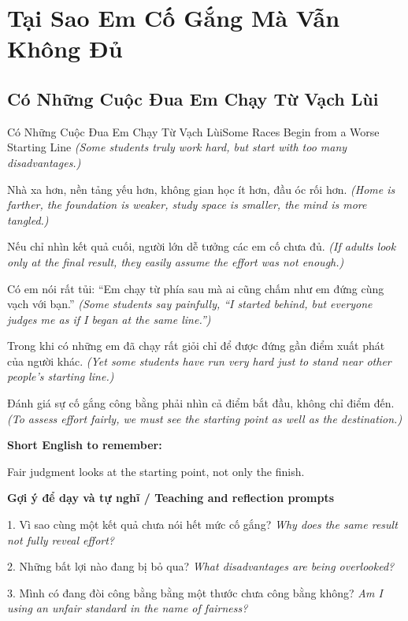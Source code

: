\chapter{Tại Sao Em Cố Gắng Mà Vẫn Không Đủ}

\section{Có Những Cuộc Đua Em Chạy Từ Vạch Lùi}
\begin{truyen}{Có Những Cuộc Đua Em Chạy Từ Vạch Lùi}{Some Races Begin from a Worse Starting Line}
\textit{(Some students truly work hard, but start with too many disadvantages.)}

Nhà xa hơn, nền tảng yếu hơn, không gian học ít hơn, đầu óc rối hơn.
\textit{(Home is farther, the foundation is weaker, study space is smaller, the mind is more tangled.)}

Nếu chỉ nhìn kết quả cuối, người lớn dễ tưởng các em cố chưa đủ.
\textit{(If adults look only at the final result, they easily assume the effort was not enough.)}

Có em nói rất tủi: “Em chạy từ phía sau mà ai cũng chấm như em đứng cùng vạch với bạn.”
\textit{(Some students say painfully, “I started behind, but everyone judges me as if I began at the same line.”)}

Trong khi có những em đã chạy rất giỏi chỉ để được đứng gần điểm xuất phát của người khác.
\textit{(Yet some students have run very hard just to stand near other people's starting line.)}

\end{truyen}

\begin{baihoc}
Đánh giá sự cố gắng công bằng phải nhìn cả điểm bắt đầu, không chỉ điểm đến.
\textit{(To assess effort fairly, we must see the starting point as well as the destination.)}
\end{baihoc}

\begin{ghinhoanh}
\textbf{Short English to remember:}

Fair judgment looks at the starting point, not only the finish.

\end{ghinhoanh}

\begin{tuhocnhanh}
\textbf{Gợi ý để dạy và tự nghĩ / Teaching and reflection prompts}

1. Vì sao cùng một kết quả chưa nói hết mức cố gắng? \textit{Why does the same result not fully reveal effort?}

2. Những bất lợi nào đang bị bỏ qua? \textit{What disadvantages are being overlooked?}

3. Mình có đang đòi công bằng bằng một thước chưa công bằng không? \textit{Am I using an unfair standard in the name of fairness?}
\end{tuhocnhanh}
\ngancach

